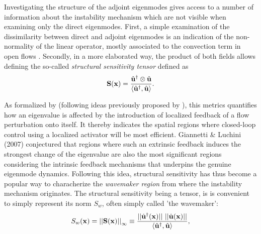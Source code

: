 \documentclass[twocolumn,10pt]{asme2ej}
\newcommand{\be}[1]{ \begin{equation} \label{#1}}
\newcommand{\ee}{\end{equation}}
\begin{document}
Investigating the structure of the adjoint eigenmodes gives access to a number of information about the instability mechanism which are not visible when examining only the direct eigenmodes. First, a simple examination of the dissimilarity between direct and adjoint eigenmodes is an indication of the non-normality of the linear operator, mostly associated to the convection term in open flows \cite{Jmc2005}. Secondly, in a more elaborated way, the product of both fields allows defining the so-called {\em structural sensitivity tensor } defined as 
\be{StructurrTens} 
{\bf{S}}({\bf{x}}) = \frac{ \hat{\bf u}^\dag \otimes \hat{\bf u} }{{\left<\hat{\bf u}^\dag, \hat{\bf u}\right>}}.
\ee 

As formalized by \cite{GiannettiLuchini} (following ideas previously proposed by \cite{hill1992theoretical}), this metrics quantifies how an eigenvalue is affected by the introduction of localized feedback of a flow perturbation onto itself. It thereby indicates the spatial regions where closed-loop control using a localized activator will be most efficient. Giannetti \& Luchini (2007) conjectured that regions where such an extrinsic feedback induces the strongest change of the eigenvalue are also the most significant regions considering the intrinsic feedback mechanisms that underpins the genuine eigenmode dynamics. Following this idea, structural sensitivity has thus become a popular way to characherize the  {\em wavemaker region} from where the instability mechanism originates. The structural sensitivity being a tensor, is is convenient to simply represent its norm $S_w$, often simply called 'the wavemaker': 
\be{Structursens} 
S_w({\bf x}) =  {||{\bf{S}}({\bf{x}})||}_\infty \equiv \frac{ ||\hat{\bf u}^\dag({\bf x})|| \,\, ||\hat{\bf u}({\bf x})|| }{{\left<\hat{\bf u}^\dag, \hat{\bf u}\right>}},
\ee 
\end{document}
